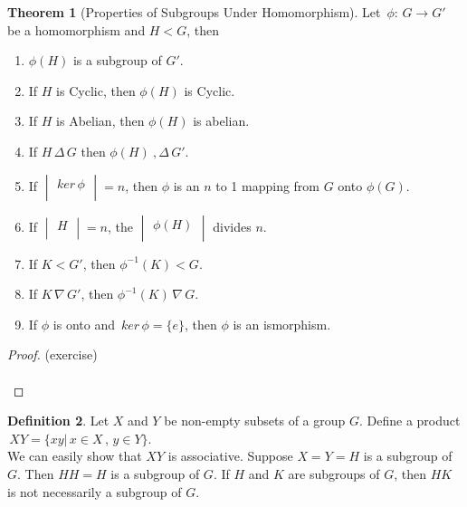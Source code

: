 \documentclass[11pt,a4paper]{article}
\theoremstyle{definition}
\newtheorem{thm}{Theorem}[subsection]
\newtheorem{defn}[thm]{Definition}
\begin{document}
\begin{thm}[Properties of Subgroups Under Homomorphism]
Let $\, \phi :\, G\longrightarrow G'\,$ be a homomorphism and $H<G$, then
\begin{enumerate}
\item $\phi (H)$ is a subgroup of $G'$.
\item If $H$ is Cyclic, then $\phi(H)$ is Cyclic.
\item If $H$ is Abelian, then $\phi (H)$ is abelian.
\item If $H\, \Delta\, G$ then $\phi(H)\ , \Delta\, G'$.
\item If $\begin{vmatrix}
ker\, \phi\\
\end{vmatrix} = n$, then $\phi$ is an $n$ to 1 mapping from $G$ onto $\phi(G)$.
\item If $\begin{vmatrix}
H\\
\end{vmatrix} = n$, the $\begin{vmatrix}
\phi(H)\\
\end{vmatrix}$ divides $n$.
\item If $K <G'$, then $\phi^{-1}(K) < G$.
\item If $K\, \nabla\, G'$, then $\phi^{-1}(K)\, \nabla\, G$.
\item If $\phi$ is onto and $\, ker\, \phi = \{e\}$, then $\phi$ is an ismorphism.\\
\end{enumerate}





\begin{proof}
(exercise)\\\\
\end{proof}
\end{thm}



\begin{defn}
Let $X$ and $Y$ be non-empty subsets of a group $G$. Define a product $\, XY = \{xy|\, x\in X\, , \, y\in Y\}$.\\
We can easily show that $XY$ is associative. Suppose $X = Y = H$ is a subgroup of $G$. Then $HH = H$  is a subgroup of $G$. If $H$ and $K$ are subgroups of $G$, then $HK$ is not necessarily a subgroup of $G$.\\\\
\end{defn}
\end{document}
